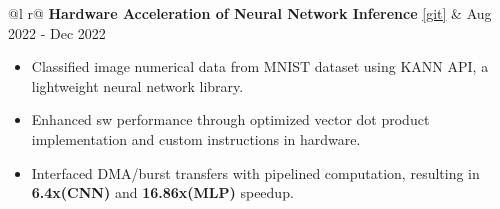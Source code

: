 \documentclass[a4paper,10pt]{article}
\begin{document}
\begin{tabularx}{\linewidth}{ @{}l r@{} }
    \textbf{Hardware Acceleration of Neural Network Inference} \href{https://github.com/sharathat45/Vector-dot-product}{[\underline{git}]} & \hfill {\small Aug 2022 - Dec 2022} \\[2.75pt]
    {
        \begin{minipage}[t]{\linewidth}
            \begin{itemize}[nosep,after=\strut, leftmargin=2em, itemsep=3pt]
                \item Classified image numerical data from MNIST dataset using KANN API, a lightweight neural network library.
                \item Enhanced sw performance through optimized vector dot product implementation and custom instructions in hardware.
                \item Interfaced DMA/burst transfers with pipelined computation, resulting in \textbf{6.4x(CNN)} and \textbf{16.86x(MLP)} speedup.
            \end{itemize}
        \end{minipage}
    }
\end{tabularx}
\vspace{0.1cm}
\end{document}
